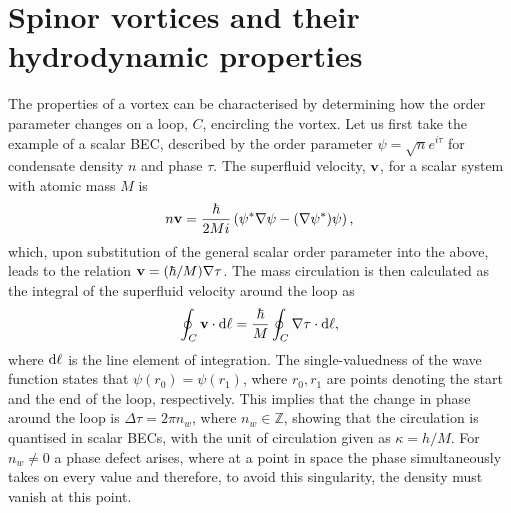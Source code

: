 \section{Spinor vortices and their hydrodynamic properties}
The properties of a vortex can be characterised by determining how the order
parameter changes on a loop, \(C\), encircling the vortex.
Let us first take the example of a scalar BEC, described by the order parameter
\(\psi = \sqrt{n}e^{i\tau}\) for condensate density \(n\) and phase \(\tau \).
The superfluid velocity, \(\vb{v}\), for a scalar system with atomic mass \(M\)
is~\cite{Barenghi2016}
\begin{align}
    n\vb{v} = \frac{\hbar}{2Mi}\left(\psi^*\nabla\psi
    - {(\nabla \psi^*)}\psi\right),
\end{align}
which, upon substitution of the general scalar order parameter into the above,
leads to the relation \(\vb{v} = (\hbar / M) \nabla\tau \).
The mass circulation is then calculated as the integral of the superfluid
velocity around the loop as~\cite{Barenghi2016}
\begin{align}\label{eq: mass-circulation}
    \oint_C \vb{v} \cdot \dd\vb{\ell} =
    \frac{\hbar}{M}\oint_C \nabla \tau \cdot \dd \vb{\ell},
\end{align}
where \(\dd \vb{\ell} \) is the line element of integration.
The single-valuedness of the wave function states that \(\psi(r_0)=\psi(r_1)\),
where \(r_0, r_1\) are points denoting the start and the end of the loop,
respectively.
This implies that the change in phase around the loop is
\(\Delta \tau = 2\pi n_w\), where \(n_w \in \mathbb{Z}\), showing that the
circulation is quantised in scalar BECs, with the unit of circulation given as
\(\kappa = h / M\).
For \(n_w \neq 0\) a phase defect arises, where at a point in space the phase
simultaneously takes on every value and therefore, to avoid this singularity,
the density must vanish at this point.

